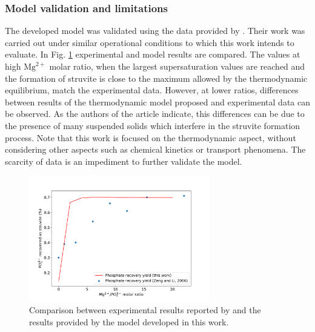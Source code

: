 \documentclass[10pt,a4paper]{article}
\begin{document}
\subsubsection{Model validation and limitations}
The developed model was validated using the data provided by . Their work was carried out under similar operational conditions to which this work intends to evaluate. In Fig. \ref{fig:validation} experimental and model results are compared. The values at high $\text{Mg}^{2+}$ molar ratio, when the largest supersaturation values are reached and the formation of struvite is close to the maximum allowed by the thermodynamic equilibrium, match the experimental data. However, at lower ratios, differences between results of the thermodynamic model proposed and experimental data can be observed. As the authors of the article indicate, this differences can be due to the presence of many suspended solids which interfere in the struvite formation process. Note that this work is focused on the thermodynamic aspect, without considering other aspects such as chemical kinetics or transport phenomena. The scarcity of data is an impediment to further validate the model.
\begin{figure}[] 
	\centering
	\includegraphics[width=0.7\textwidth, trim=0 0cm 0 1.5cm, clip]{validation} 
	\caption{Comparison between experimental results reported by \protect{} and the results provided by the model developed in this work.} \label{fig:validation}
\end{figure}
\end{document}
